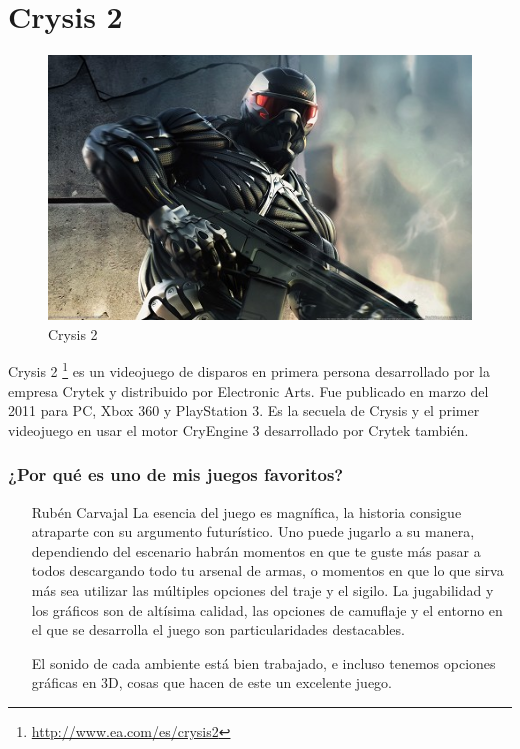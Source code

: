 \section{Crysis 2}

\begin{figure}[htbp]
\begin{center}
\includegraphics[width=.60\textwidth]{./imagenes/crysis2.jpg}
\caption{Crysis 2}
\label{Crysis 2}
\end{center}
\end{figure}
Crysis 2 \footnote{\url{http://www.ea.com/es/crysis2}} es un videojuego de disparos en primera persona desarrollado por la empresa Crytek y distribuido por Electronic Arts. Fue publicado en marzo del 2011 para PC, Xbox 360 y PlayStation 3. Es la secuela de Crysis y el primer videojuego en usar el motor CryEngine 3 desarrollado por Crytek también.

\subsubsection{¿Por qué es uno de mis juegos favoritos?}
\begin{itemize}
\item[Rubén Carvajal] La esencia del juego es magnífica, la historia consigue atraparte con su argumento futurístico.
Uno puede jugarlo a su manera, dependiendo del escenario habrán momentos en que te guste más pasar a todos descargando todo tu arsenal de armas, o momentos en que lo que sirva más sea utilizar las múltiples opciones del traje y el sigilo.
La jugabilidad y los gráficos son de altísima calidad, las opciones de camuflaje y el entorno en el que se desarrolla el juego son particularidades destacables.

El sonido de cada ambiente está bien trabajado, e incluso tenemos opciones gráficas en 3D, cosas que hacen de este un excelente juego.
\end{itemize}
